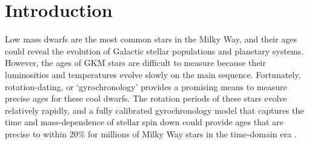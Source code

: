 \section{Introduction}

Low mass dwarfs are the most common stars in the Milky Way, and their ages
could reveal the evolution of Galactic stellar populations and planetary
systems.
However, the ages of GKM stars are difficult to measure because their
luminosities and temperatures evolve slowly on the main sequence.
Fortunately, rotation-dating, or `gyrochronology’ provides a promising means
to measure precise ages for these cool dwarfs.
The rotation periods of these stars evolve relatively rapidly, and a fully
calibrated gyrochronology model that captures the time and mass-dependence of
stellar spin down could provide ages that are precise to within 20\% for
millions of Milky Way stars in the time-domain era \citep{epstein2014,
najita2016, angus2019}.

